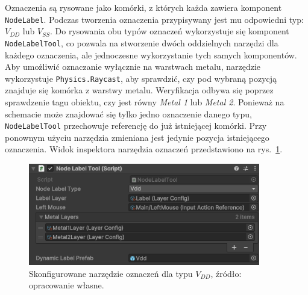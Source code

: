 Oznaczenia są rysowane jako komórki,
z których każda zawiera komponent \texttt{NodeLabel}.
Podczas tworzenia oznaczenia przypisywany jest mu odpowiedni typ: $V_{DD}$ lub $V_{SS}$.
Do rysowania obu typów oznaczeń wykorzystuje się komponent \texttt{NodeLabelTool},
co pozwala na stworzenie dwóch oddzielnych narzędzi dla każdego oznaczenia,
ale jednoczesne wykorzystanie tych samych komponentów.
Aby umożliwić oznaczanie wyłącznie na warstwach metalu, narzędzie wykorzystuje \texttt{Physics.Raycast},
aby sprawdzić, czy pod wybraną pozycją znajduje się komórka z warstwy metalu.
Weryfikacja odbywa się poprzez sprawdzenie tagu obiektu, czy jest równy \textit{Metal 1} lub \textit{Metal 2}.
Ponieważ na schemacie może znajdować się tylko jedno oznaczenie danego typu,
\texttt{NodeLabelTool} przechowuje referencję do już istniejącej komórki.
Przy ponownym użyciu narzędzia zmieniana jest jedynie pozycja istniejącego oznaczenia.
Widok inspektora narzędzia oznaczeń przedstawiono na rys.~\ref{fig:label}.

\begin{figure}[h!]
    \centering
    \includegraphics[width=0.9\textwidth]{chapters/chapter4/rys/tools/node_label_tool}
    \caption[Skonfigurowane narzędzie oznaczeń dla typu $V_{DD}$.]
    {Skonfigurowane narzędzie oznaczeń dla typu $V_{DD}$, źródło: opracowanie własne.}
    \label{fig:label}
\end{figure}


